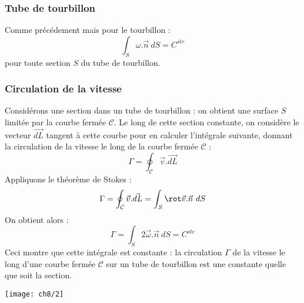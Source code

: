 \subsubsection{Tube de tourbillon}
Comme précédement mais pour le tourbillon :
\begin{equation}
	\int_S \omega.\vec{n}\ dS = C^{ste}
\end{equation}
pour toute section $S$ du tube de tourbillon.
		
		
\subsubsection{Circulation de la vitesse}
Considérons une section dans un tube de tourbillon : on obtient une
surface $S$ limitée par la courbe fermée $\mathcal{C}$. Le long de cette 
section constante, on considère le vecteur $\vec{dL}$ tangent à cette courbe 
pour en calculer l'intégrale suivante, donnant la circulation de la vitesse 
le long de la courbe fermée $\mathcal{C}$ :
\begin{equation}
	\Gamma = \oint_\mathcal{C} \vec{v}.\vec{dL}
\end{equation}
Appliquons le théorème de Stokes :
\begin{equation}
	\Gamma = \oint_\mathcal{C} \vec{v}.\vec{dL} = \int_S \rot \vec{v}.\vec{n}\ dS
\end{equation}
On obtient alors :
\begin{equation}
	\Gamma = \int_S 2\vec{\omega}.\vec{n}\ dS = C^{ste}
\end{equation}
Ceci montre que cette intégrale est constante : la circulation $\Gamma$ de la 
vitesse le long d'une courbe fermée $\mathcal{C}$ sur un tube de tourbillon est 
une constante quelle que soit la section.\\
\begin{center}
	\texttt{[image: ch8/2]}
\end{center}
